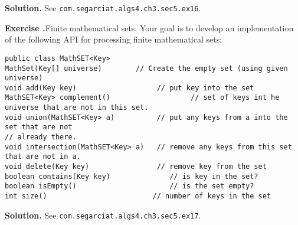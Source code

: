 \documentclass[12pt, a4paper]{article}
\newenvironment{ex}[2][Exercise]
{\par\medskip\noindent \textbf{#1 #2.}}
{\medskip}
\newenvironment{sol}[1][Solution]
{\par\medskip\noindent \textbf{#1.} }
{\medskip}
\begin{document}
	\begin{sol}
		See \texttt{com.segarciat.algs4.ch3.sec5.ex16}.
	\end{sol}
	\begin{ex}{17}
		\emph{Finite mathematical sets}. Your goal is to develop an implementation of
		the following API for processing finite mathematical sets:
		\begin{lstlisting}[language={}]
		public class MathSET<Key>
MathSet(Key[] universe)        // Create the empty set (using given universe)
void add(Key key)                   // put key into the set
MathSET<Key> complement()                   // set of keys int he universe that are not in this set.
void union(MathSET<Key> a)          // put any keys from a into the set that are not
// already there.
void intersection(MathSET<Key> a)   // remove any keys from this set that are not in a.
void delete(Key key)                // remove key from the set
boolean contains(Key key)              // is key in the set?
boolean isEmpty()                      // is the set empty?
int size()                         // number of keys in the set
		\end{lstlisting}
	\end{ex}
	\begin{sol}
		See \texttt{com.segarciat.algs4.ch3.sec5.ex17}.
	\end{sol}
	\pagebreak
	\printbibliography
\end{document}
